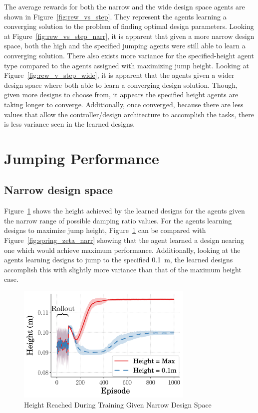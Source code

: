 %    

The average rewards for both the narrow and the wide design space agents are shown in Figure~\ref{fig:rew_vs_step}. They represent the agents learning a converging solution to the problem of finding optimal design parameters. Looking at Figure~\ref{fig:rew_vs_step_narr}, it is apparent that given a more narrow design space, both the high and the specified jumping agents were still able to learn a converging solution. There also exists more variance for the specified-height agent type compared to the agents assigned with maximizing jump height. Looking at Figure~\ref{fig:rew_v_step_wide}, it is apparent that the agents given a wider design space where both able to learn a converging design solution. Though, given more designs to choose from, it appears the specified height agents are taking longer to converge. Additionally, once converged, because there are less values that allow the controller/design architecture to accomplish the tasks, there is less variance seen in the learned designs.

\section{Jumping Performance}
\subsection{Narrow design space}

Figure~\ref{fig:height_v_step_narr} shows the height achieved by the learned designs for the agents given the narrow range of possible damping ratio values. For the agents learning designs to maximize jump height, Figure~\ref{fig:height_v_step_narr} can be compared with Figure~\ref{fig:spring_zeta_narr} showing that the agent learned a design nearing one which would achieve maximum performance. Additionally, looking at the agents learning designs to jump to the specified 0.1~m, the learned designs accomplish this with slightly more variance than that of the maximum height case.
% 
\begin{figure}[tb!]
        \centering
        \includegraphics[width=0.75\textwidth]{figures/Ch4/design_space_narr/HeightVsTime.png}  
        \caption{Height Reached During Training Given Narrow Design Space}
        \label{fig:height_v_step_narr}
\end{figure}
% 

